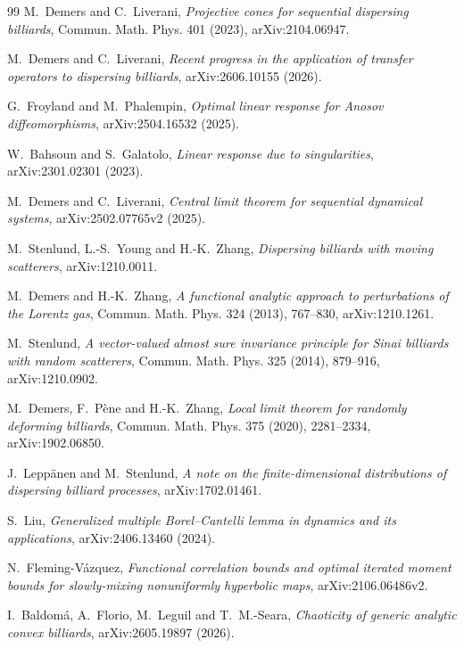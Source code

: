 \documentclass[11pt]{article}
\begin{document}
\begingroup\raggedright
\begin{thebibliography}{99}
M.~Demers and C.~Liverani,
\emph{Projective cones for sequential dispersing billiards},
Commun. Math. Phys. 401 (2023), arXiv:2104.06947.

M.~Demers and C.~Liverani,
\emph{Recent progress in the application of transfer operators to dispersing
billiards}, arXiv:2606.10155 (2026).

G.~Froyland and M.~Phalempin,
\emph{Optimal linear response for Anosov diffeomorphisms},
arXiv:2504.16532 (2025).

W.~Bahsoun and S.~Galatolo,
\emph{Linear response due to singularities}, arXiv:2301.02301 (2023).

M.~Demers and C.~Liverani,
\emph{Central limit theorem for sequential dynamical systems},
arXiv:2502.07765v2 (2025).

M.~Stenlund, L.-S.~Young and H.-K.~Zhang,
\emph{Dispersing billiards with moving scatterers},
arXiv:1210.0011.

M.~Demers and H.-K.~Zhang,
\emph{A functional analytic approach to perturbations of the Lorentz gas},
Commun. Math. Phys. 324 (2013), 767--830, arXiv:1210.1261.

M.~Stenlund,
\emph{A vector-valued almost sure invariance principle for Sinai billiards
with random scatterers},
Commun. Math. Phys. 325 (2014), 879--916, arXiv:1210.0902.

M.~Demers, F.~P\`ene and H.-K.~Zhang,
\emph{Local limit theorem for randomly deforming billiards},
Commun. Math. Phys. 375 (2020), 2281--2334, arXiv:1902.06850.

J.~Lepp\"anen and M.~Stenlund,
\emph{A note on the finite-dimensional distributions of dispersing billiard processes},
arXiv:1702.01461.

S.~Liu,
\emph{Generalized multiple Borel--Cantelli lemma in dynamics and its
applications}, arXiv:2406.13460 (2024).

N.~Fleming-V\'azquez,
\emph{Functional correlation bounds and optimal iterated moment bounds for
slowly-mixing nonuniformly hyperbolic maps}, arXiv:2106.06486v2.

I.~Baldom\'a, A.~Florio, M.~Leguil and T.~M.-Seara,
\emph{Chaoticity of generic analytic convex billiards},
arXiv:2605.19897 (2026).


\end{thebibliography}
\end{document}
